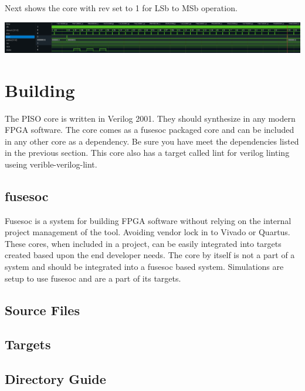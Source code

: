 \par
Next shows the core with rev set to 1 for LSb to MSb operation.

\includegraphics[width=\textwidth]{img/diagrams/waveform_rev1.png}

\section{Building}

\par
The PISO core is written in Verilog 2001. They should synthesize in any modern FPGA software. The core comes as a fusesoc packaged core and can be included in any other core as a dependency. Be sure you have meet the dependencies listed in the previous section. This core also has a target called lint for verilog linting useing verible-verilog-lint.

\subsection{fusesoc}
\par
Fusesoc is a system for building FPGA software without relying on the internal project management of the tool. Avoiding vendor lock in to Vivado or Quartus.
These cores, when included in a project, can be easily integrated into targets created based upon the end developer needs. The core by itself is not a part of
a system and should be integrated into a fusesoc based system. Simulations are setup to use fusesoc and are a part of its targets.

\subsection{Source Files}



\subsection{Targets}



\subsection{Directory Guide}

